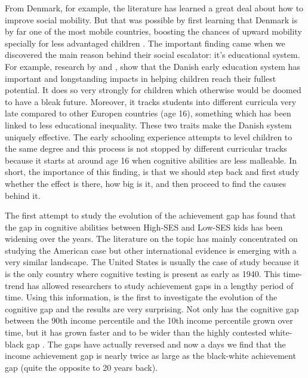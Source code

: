 \documentclass[11pt, a4paper]{article}\usepackage[]{graphicx}\usepackage[]{color}
\begin{document}
From Denmark, for example, the literature has learned a great deal about how to improve social mobility. But that was possible by first learning that Denmark is by far one of the most mobile countries, boosting the chances of upward mobility specially for less advantaged children \citep{bjorklund2009, jaeger2007}. The important finding came when we discovered the main reason behind their social escalator: it's educational system. For example, research by \citet{esping_waldfogel2012} and \citet{bauchmuller2014}, show that the Danish early education system has important and longstanding impacts in helping children reach their fullest potential. It does so very strongly for children which otherwise would be doomed to have a bleak future. Moreover, it tracks students into different curricula very late compared to other Europen countries (age 16), something which has been linked to less educational inequality. These two traits make the Danish system uniquely effective. The early schooling experience attempts to level children to the same degree and this process is not stopped by different curricular tracks because it starts at around age 16 when cognitive abilities are less malleable. In short, the importance of this finding, is that we should step back and first study whether the effect is there, how big is it, and then proceed to find the causes behind it.

The first attempt to study the evolution of the achievement gap has found that the gap in cognitive abilities between High-SES and Low-SES kids has been widening over the years. The literature on the topic has mainly concentrated on studying the American case \citep{reardon2011} but other international evidence is emerging with a very similar landscape. The United States is usually the case of study because it is the only country where cognitive testing is present as early as 1940. This time-trend has allowed researchers to study achievement gaps in a lengthy period of time. Using this information, \citet{reardon2011} is the first to investigate the evolution of the cognitive gap and the results are very surprising. Not only has the cognitive gap between the 90th income percentile and the 10th income percentile grown over time, but it has grown faster and to be wider than the highly contested white-black gap \citep{magnuson2008}. The gaps have actually reversed and now a days we find that the income achievement gap is nearly twice as large as the black-white achievement gap (quite the opposite to 20 years back).
\end{document}
